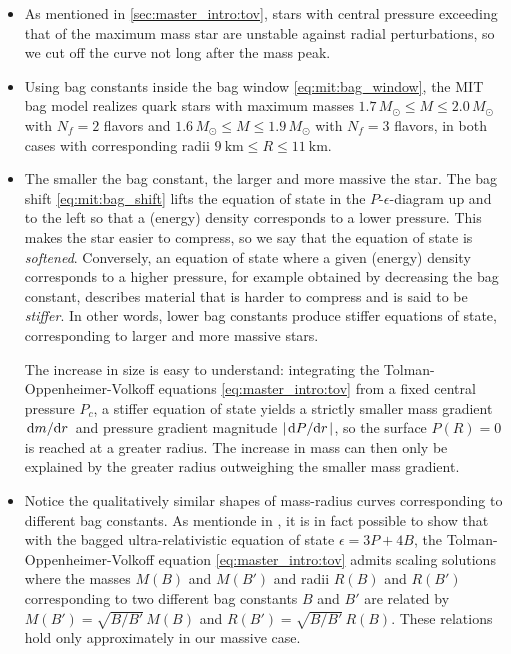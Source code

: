 \begin{itemize}
\item As mentioned in \cref{sec:master_intro:tov},
      stars with central pressure exceeding that of the maximum mass star are unstable against radial perturbations,
      so we cut off the curve not long after the mass peak.
\item Using bag constants inside the bag window \eqref{eq:mit:bag_window},
      the MIT bag model realizes quark stars with maximum masses
      $1.7 \, M_\odot \leq M \leq 2.0 \, M_\odot$ with $N_f=2$ flavors
      and $1.6 \, M_\odot \leq M \leq 1.9 \, M_\odot$ with $N_f=3$ flavors,
      in both cases with corresponding radii $\SI{9}{\kilo\meter} \leq R \leq \SI{11}{\kilo\meter}$.
\item The smaller the bag constant, the larger and more massive the star.
      The bag shift \eqref{eq:mit:bag_shift} lifts the equation of state in the $P$-$\epsilon$-diagram up and to the left
      so that a (energy) density corresponds to a lower pressure.
      This makes the star easier to compress, so we say that the equation of state is \emph{softened}.
      Conversely, an equation of state where a given (energy) density corresponds to a higher pressure,
      for example obtained by decreasing the bag constant,
      describes material that is harder to compress and is said to be \emph{stiffer}.
      In other words, lower bag constants produce stiffer equations of state,
      corresponding to larger and more massive stars.

      The increase in size is easy to understand:
      integrating the Tolman-Oppenheimer-Volkoff equations \eqref{eq:master_intro:tov} from a fixed central pressure $P_c$,
      a stiffer equation of state yields a strictly smaller mass gradient $\odv{m}/{r}$ and pressure gradient magnitude $\abs{\odv{P}/{r}}$,
      so the surface $P(R)=0$ is reached at a greater radius.
      The increase in mass can then only be explained by the greater radius outweighing the smaller mass gradient.
\item Notice the qualitatively similar shapes of mass-radius curves corresponding to different bag constants.
      As mentionde in \cite[equation 8.29]{ref:glendenning},
      it is in fact possible to show that with the bagged ultra-relativistic equation of state $\epsilon = 3P + 4B$,
      the Tolman-Oppenheimer-Volkoff equation \eqref{eq:master_intro:tov} admits scaling solutions
      where the masses $M(B)$ and $M(B')$ and radii $R(B)$ and $R(B')$ corresponding to two different bag constants $B$ and $B'$
      are related by $M(B') = \sqrt{B/B'} \, M(B)$ and $R(B') = \sqrt{B/B'} \, R(B)$.
      These relations hold only approximately in our massive case.
\end{itemize}

